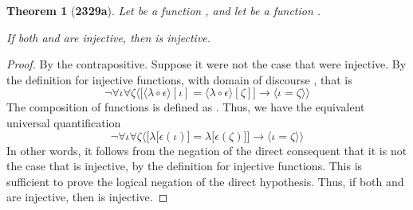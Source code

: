 \documentclass[preview]{standalone}
\newtheorem{theorem}{Theorem}
\begin{document}
\begin{theorem}[\textbf{2329a}]
    Let \bm{$\lambda$} be a function 
    , 
    and let \bm{$\epsilon$} be a function 
    \bm{$\epsilon: \Lambda \rightarrow \Delta$}. 
    \begin{center}
        If both \bm{$\lambda$} and \bm{$\epsilon$} are injective, 
        then \bm{$\big \langle \lambda \circ \epsilon \big \rangle$} is injective.
    \end{center}
\end{theorem}

\begin{proof}
    By the contrapositive.
    Suppose it were not the case that 
    \bm{$\big \langle \lambda \circ \epsilon \big \rangle$}
    were injective. 
    By the definition for injective functions, 
    with domain of discourse 
    \bm{$\big \langle \iota, \zeta \in \Lambda \big \rangle$}, that is
    \begin{equation*}
        \lnot \forall \iota \forall \zeta \bigg \langle 
            \Big[
                \big \langle \lambda \circ \epsilon \big \rangle [\iota] 
                    = 
                \big \langle \lambda \circ \epsilon \big \rangle [\zeta] 
            \Big]
                \rightarrow 
            \big \langle \iota = \zeta \big \rangle 
        \bigg \rangle
    \end{equation*}
    The composition of functions 
    \bm{$\big \langle \lambda \circ \epsilon \big \rangle [\iota]$} 
    is defined as \bm{$\lambda \big[ \epsilon (\iota) \big]$}. 
    Thus, we have the equivalent universal quantification
    \begin{equation*}
        \lnot \forall \iota \forall \zeta \bigg \langle 
            \Big[
                \lambda \big[ \epsilon (\iota) \big] 
                    = 
                \lambda \big[ \epsilon (\zeta) \big] 
            \Big]
                \rightarrow
            \big \langle \iota = \zeta \big \rangle
        \bigg \rangle
    \end{equation*}
    In other words, it follows from the negation of the direct consequent that 
    it is not the case that \bm{$\lambda$} is injective, 
    by the definition for injective functions. 
    This is sufficient to prove the logical negation of the direct hypothesis. 
    Thus, if both \bm{$\lambda$} and \bm{$\epsilon$} are injective, 
    then 
    \bm{$\big \langle \lambda \circ \epsilon \big \rangle$} 
    is injective.
\end{proof}
\end{document}
